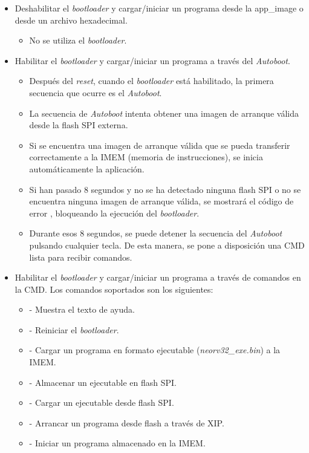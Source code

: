 \begin{itemize}
    \item Deshabilitar el \textit{bootloader} y cargar/iniciar un programa desde la app\_image o desde un archivo hexadecimal.
        \begin{itemize}
            \item No se utiliza el \textit{bootloader}.
        \end{itemize} 
    \item Habilitar el \textit{bootloader} y cargar/iniciar un programa a través del \textit{Autoboot}.
        \begin{itemize}
            \item Después del \textit{reset}, cuando el \textit{bootloader} está habilitado, la primera secuencia que ocurre es el \textit{Autoboot}.
            \item La secuencia de \textit{Autoboot} intenta obtener una imagen de arranque válida desde la flash SPI externa.
            \item Si se encuentra una imagen de arranque válida que se pueda transferir correctamente a la IMEM (memoria de instrucciones), se inicia automáticamente la aplicación.
            \item Si han pasado 8 segundos y no se ha detectado ninguna flash SPI o no se encuentra ninguna imagen de arranque válida, se mostrará el código de error , bloqueando la ejecución del \textit{bootloader}.
            \item Durante esos 8 segundos, se puede detener la secuencia del \textit{Autoboot} pulsando cualquier tecla. 
De esta manera, se pone a disposición una CMD lista para recibir comandos.
        \end{itemize} 
    \item Habilitar el \textit{bootloader} y cargar/iniciar un programa a través de comandos en la CMD.
Los comandos soportados son los siguientes:
        \begin{itemize}
            \item {} - Muestra el texto de ayuda.
            \item {} - Reiniciar el \textit{bootloader}.
            \item {} - Cargar un programa en formato ejecutable (\textit{neorv32\_exe.bin}) a la IMEM.
            \item {} - Almacenar un ejecutable en flash SPI.
            \item {} - Cargar un ejecutable desde flash SPI.
            \item {} - Arrancar un programa desde flash a través de XIP.
            \item {} - Iniciar un programa almacenado en la IMEM.
        \end{itemize} 
\end{itemize} 

